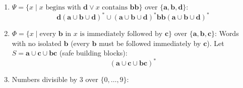 \begin{enumerate}[{6.}1.]
\begin{enumerate}[(a)]
  \item $L_3=\{z\mid|z|_{\pmb{a}}\text{ even}\}$:
  \[
    ((\pmb{b}\cup\pmb{c})^*\pmb{a}(\pmb{b}\cup\pmb{c})^*\pmb{a})^*(\pmb{b}\cup\pmb{c})^*
  \]

  \item $L_4=\{z\mid|z|_{\pmb{c}}\text{ prime}\}$: This language is not regular.
  If it were FAD, let $p$ be a pumping length and choose a prime $q>p$.
  Then $\pmb{c}^q\in L_4$.  Write
  \[
    \pmb{c}^q=uvw
  \]
  with $|uv|\le p$ and $|v|\ge 1$.  Since the word is unary, let $|v|=m\ge 1$.
  Pump with $i=q+1$.  The pumped word has length
  \[
    q+qm=q(1+m),
  \]
  which is composite.  Hence $uv^{q+1}w\notin L_4$, contradicting the pumping
  lemma.  Therefore $L_4$ has no regular expression.

  \item $L_5=\{x\mid\pmb{abc}\text{ is a substring}\}$:
  \[
    (\pmb{a}\cup\pmb{b}\cup\pmb{c})^*\pmb{abc}(\pmb{a}\cup\pmb{b}\cup\pmb{c})^*
  \]

  \item $L_6=\{x\mid\pmb{acaba}\text{ is a substring}\}$:
  \[
    (\pmb{a}\cup\pmb{b}\cup\pmb{c})^*\pmb{acaba}(\pmb{a}\cup\pmb{b}\cup\pmb{c})^*
  \]

  \item $L_7=\{x\mid|x|_{\pmb{a}}\equiv 0\pmod{3}\}$:
  \[
    (\pmb{b}\cup\pmb{c})^*(\pmb{a}(\pmb{b}\cup\pmb{c})^*\pmb{a}(\pmb{b}\cup\pmb{c})^*\pmb{a}(\pmb{b}\cup\pmb{c})^*)^*
  \]
\end{enumerate}

\item $\Psi=\{x\mid x\text{ begins with }\pmb{d}\vee x\text{ contains }\pmb{bb}\}$ over $\{\pmb{a},\pmb{b},\pmb{d}\}$:
\[
  \pmb{d}(\pmb{a}\cup\pmb{b}\cup\pmb{d})^*
  \cup
  (\pmb{a}\cup\pmb{b}\cup\pmb{d})^*\pmb{bb}(\pmb{a}\cup\pmb{b}\cup\pmb{d})^*
\]

\item $\Phi=\{x\mid\text{every }\pmb{b}\text{ in }x\text{ is immediately followed by }\pmb{c}\}$ over $\{\pmb{a},\pmb{b},\pmb{c}\}$:
Words with no isolated $\pmb{b}$ (every $\pmb{b}$ must be followed immediately by $\pmb{c}$).  Let $S=\pmb{a}\cup\pmb{c}\cup\pmb{bc}$ (safe building blocks):
\[
  (\pmb{a}\cup\pmb{c}\cup\pmb{bc})^*
\]

\item Numbers divisible by 3 over $\{0,\ldots,9\}$:


\end{enumerate}
